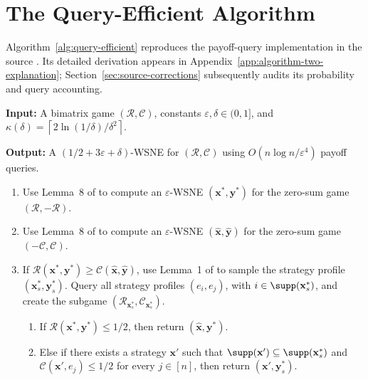 \section{The Query-Efficient Algorithm}

Algorithm~\ref{alg:query-efficient} reproduces the payoff-query implementation in the source \cite[Algorithm~2]{12WSNE}. Its detailed derivation appears in Appendix~\ref{app:algorithm-two-explanation}; Section~\ref{sec:source-corrections} subsequently audits its probability and query accounting.

\begin{algorithm}[H]
  \caption{Query-Efficient Implementation of Algorithm~\ref{alg:full-information}}
  \label{alg:query-efficient}
  \footnotesize
  \textbf{Input:} A bimatrix game \((\mathcal{R},\mathcal{C})\), constants
  \(\varepsilon,\delta\in(0,1]\), and
  \(\kappa(\delta)=\left\lceil 2\ln(1/\delta)/\delta^2\right\rceil\).\par
  \textbf{Output:} A \((1/2+3\varepsilon+\delta)\)-WSNE for
  \((\mathcal{R},\mathcal{C})\) using
  \(O(n\log n/\varepsilon^4)\) payoff queries.
  \begin{enumerate}[label=\arabic*.,leftmargin=1.8em,itemsep=0.18em,topsep=0.3em]
    \item Use Lemma~8 of \cite{12WSNE} to compute an \(\varepsilon\)-WSNE \((\mathbf{x}^*,\mathbf{y}^*)\) for the zero-sum game \((\mathcal{R},-\mathcal{R})\).
    \item Use Lemma~8 of \cite{12WSNE} to compute an \(\varepsilon\)-WSNE \((\hat{\mathbf{x}},\hat{\mathbf{y}})\) for the zero-sum game \((-\mathcal{C},\mathcal{C})\).
    \item If \(\mathcal{R}(\mathbf{x}^*,\mathbf{y}^*)\geq \mathcal{C}(\hat{\mathbf{x}},\hat{\mathbf{y}})\), use Lemma~1 of \cite{12WSNE} to sample the strategy profile \((\mathbf{x}_s^*,\mathbf{y}_s^*)\). Query all strategy profiles \((e_i,e_j)\), with \(i\in\supp(\mathbf{x}_s^*)\), and create the subgame \((\mathcal{R}_{\mathbf{x}_s^*},\mathcal{C}_{\mathbf{x}_s^*})\).
      \begin{enumerate}[label=(\alph*),leftmargin=2.2em,itemsep=0.1em,topsep=0.1em]
        \item If \(\mathcal{R}(\mathbf{x}^*,\mathbf{y}^*)\leq 1/2\), then return \((\hat{\mathbf{x}},\mathbf{y}^*)\).
        \item Else if there exists a strategy \(\mathbf{x}'\) such that
        \(\supp(\mathbf{x}')\subseteq\supp(\mathbf{x}_s^*)\) and
        \(\mathcal{C}(\mathbf{x}',e_j)\leq 1/2\) for every \(j\in[n]\), then return \((\mathbf{x}',\mathbf{y}_s^*)\).

\end{enumerate}
\end{enumerate}
\end{algorithm}
